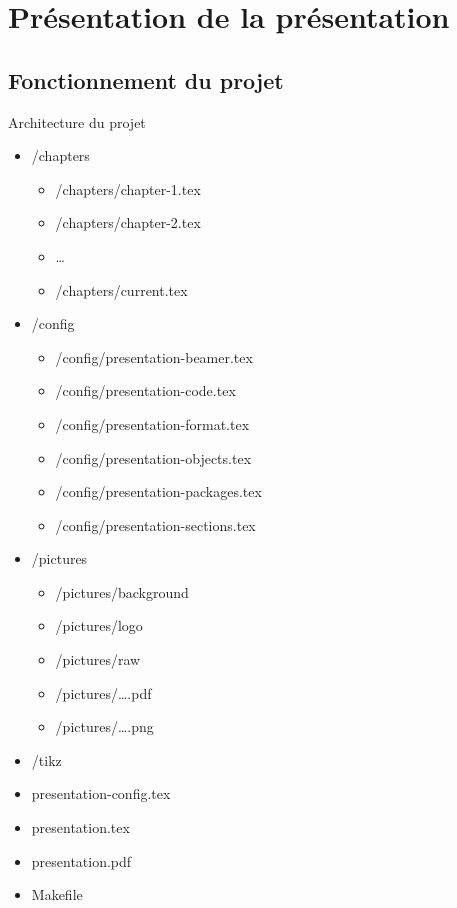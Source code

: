 
\section{Présentation de la présentation}

\subsection{Fonctionnement du projet}

\begin{frame}{Architecture du projet}
    \begin{twocolumns}
        \leftcol
        \begin{itemize}
            \item /chapters
            \begin{itemize}
                \item /chapters/chapter-1.tex
                \item /chapters/chapter-2.tex
                \item \dots
                \item /chapters/current.tex
            \end{itemize}
            \item /config
            \begin{itemize}
                \item /config/presentation-beamer.tex
                \item /config/presentation-code.tex
                \item /config/presentation-format.tex
                \item /config/presentation-objects.tex
                \item /config/presentation-packages.tex
                \item /config/presentation-sections.tex
            \end{itemize}
        \end{itemize}
        \rightcol
        \begin{itemize}
            \item /pictures
            \begin{itemize}
                \item /pictures/background
                \item /pictures/logo
                \item /pictures/raw
                \item /pictures/\dots .pdf
                \item /pictures/\dots .png
            \end{itemize}
            \item /tikz
            \item presentation-config.tex
            \item presentation.tex
            \item presentation.pdf
            \item Makefile
        \end{itemize}
    \end{twocolumns}
\end{frame}
